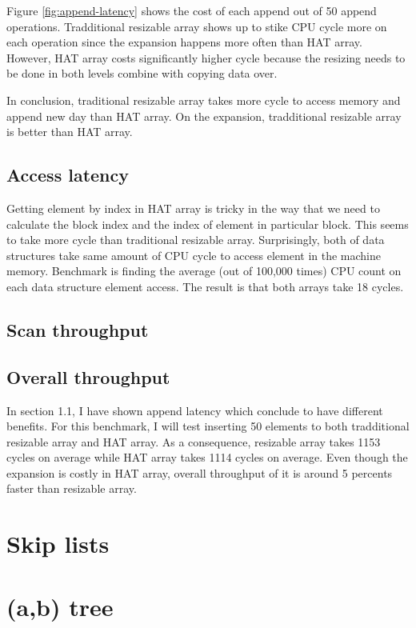 \documentclass[a4paper, 12pt]{report}
\begin{document}
Figure \ref{fig:append-latency} shows the cost of each append out of 50 append operations.
Tradditional resizable array shows up to stike CPU cycle more on each operation since the expansion
happens more often than HAT array. However, HAT array costs significantly higher cycle because the 
resizing needs to be done in both levels combine with copying data over.

In conclusion, traditional resizable array takes more cycle to access memory and append new day than
HAT array. On the expansion, tradditional resizable array is better than HAT array.

\section{Access latency}

Getting element by index in HAT array is tricky in the way that we need to calculate the block index and 
the index of element in particular block. This seems to take more cycle than traditional resizable array. 
Surprisingly, both of data structures take same amount of CPU cycle to access element in the machine memory.
Benchmark is finding the average (out of 100,000 times) CPU count on each data structure element access. The result
is that both arrays take 18 cycles.

\section{Scan throughput}

\section{Overall throughput}

In section 1.1, I have shown append latency which conclude to have different benefits.
For this benchmark, I will test inserting 50 elements to both tradditional resizable array and
HAT array. As a consequence, resizable array takes 1153 cycles on average while HAT array takes
1114 cycles on average. Even though the expansion is costly in HAT array, overall throughput
of it is around 5 percents faster than resizable array.


\chapter{Skip lists}

\chapter{(a,b) tree}
\end{document}
